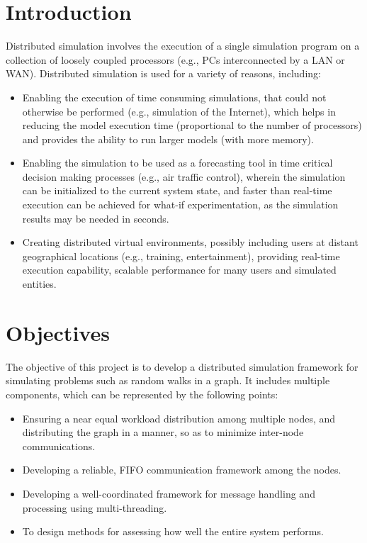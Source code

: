 \documentclass[12pt,a4paper]{article}
\begin{document}
\section{Introduction}
	Distributed simulation involves the execution of a single simulation program on a collection of loosely coupled processors (e.g., PCs interconnected by a LAN or WAN). Distributed simulation is used for a variety of reasons, including:
	\begin{itemize}
		\item Enabling the execution of time consuming simulations, that could not otherwise be performed (e.g., simulation of the Internet), which helps in reducing the model execution time (proportional to the number of processors) and provides the ability to run larger models (with more memory).
		\item Enabling the simulation to be used as a forecasting tool in time critical decision making processes (e.g., air traffic control), wherein the simulation can be initialized to the current system state, and faster than real-time execution can be achieved for what-if experimentation, as the simulation results may be needed in seconds.
		\item Creating distributed virtual environments, possibly including users at distant geographical locations (e.g., training, entertainment), providing real-time execution capability, scalable performance for many users and simulated entities.
	\end{itemize}
	
\section{Objectives}
	The objective of this project is to develop a distributed simulation framework for simulating problems such as random walks in a graph. It includes multiple components, which can be represented by the following points:
	\begin{itemize}
		\item Ensuring a near equal workload distribution among multiple nodes, and distributing the graph in a manner, so as to minimize inter-node communications.
		\item Developing a reliable, FIFO communication framework among the nodes.
		\item Developing a well-coordinated framework for message handling and processing using multi-threading.
		\item To design methods for assessing how well the entire system performs.
	\end{itemize}
\end{document}
